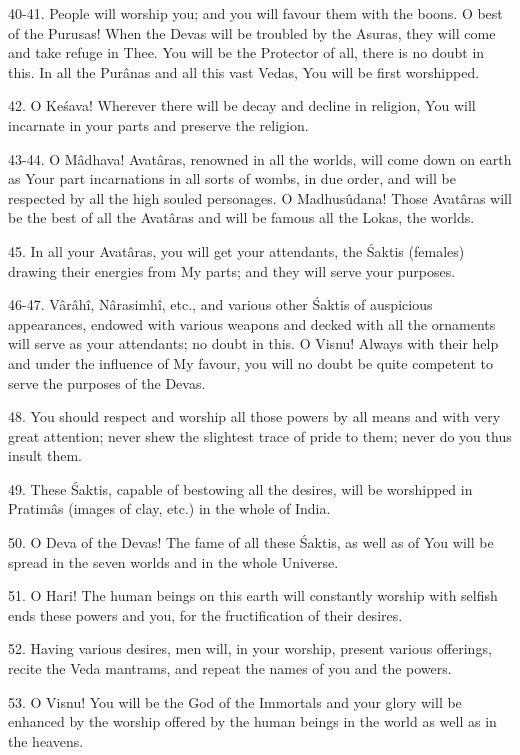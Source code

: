 40-41. People will worship you; and you will favour them with the boons. O best of the Purusas! When the Devas will be troubled by the Asuras, they will come and take refuge in Thee. You will be the Protector of all, there is no doubt in this. In all the Pur\^anas and all this vast Vedas, You will be first worshipped.

42. O Ke\'sava! Wherever there will be decay and decline in religion, You will incarnate in your parts and preserve the religion.

43-44. O M\^adhava! Avat\^aras, renowned in all the worlds, will come down on earth as Your part incarnations in all sorts of wombs, in due order, and will be respected by all the high souled personages. O Madhusûdana! Those Avat\^aras will be the best of all the Avat\^aras and will be famous all the Lokas, the worlds.

45. In all your Avat\^aras, you will get your attendants, the \'Saktis (females) drawing their energies from My parts; and they will serve your purposes.

46-47. V\^ar\^ah\^i, N\^arasimh\^i, etc., and various other \'Saktis of auspicious appearances, endowed with various weapons and decked with all the ornaments will serve as your attendants; no doubt in this. O Visnu! Always with their help and under the influence of My favour, you will no doubt be quite competent to serve the purposes of the Devas.

48. You should respect and worship all those powers by all means and with very great attention; never shew the slightest trace of pride to them; never do you thus insult them.

49. These \'Saktis, capable of bestowing all the desires, will be worshipped in Pratim\^as (images of clay, etc.) in the whole of India.

50. O Deva of the Devas! The fame of all these \'Saktis, as well as of You will be spread in the seven worlds and in the whole Universe.

51. O Hari! The human beings on this earth will constantly worship with selfish ends these powers and you, for the fructification of their desires.

52. Having various desires, men will, in your worship, present various offerings, recite the Veda mantrams, and repeat the names of you and the powers.

53. O Visnu! You will be the God of the Immortals and your glory will be enhanced by the worship offered by the human beings in the world as well as in the heavens.

